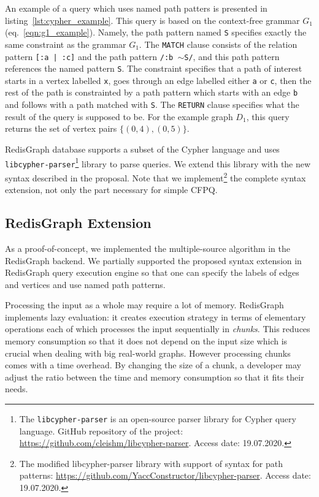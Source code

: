 An example of a query which uses named path patters is presented in listing~\ref{lst:cypher_example}.
This query is based on the context-free grammar $G_1$ (eq.~\ref{eqn:g1_example}).
Namely, the path pattern named \texttt{S} specifies exactly the same constraint as the grammar $G_1$.
The \texttt{MATCH} clause consists of the relation pattern \texttt{[:a | :c]} and the path pattern \texttt{/:b $\sim$S/}, and this path pattern references the named pattern \texttt{S}.
The constraint specifies that a path of interest starts in a vertex labelled \texttt{x}, goes through an edge labelled either \texttt{a} or \texttt{c}, then the rest of the path is constrainted by a path pattern which starts with an edge \texttt{b} and follows with a path matched with \texttt{S}.
The \texttt{RETURN} clause specifies what the result of the query is supposed to be.
For the example graph $D_1$, this query returns the set of vertex pairs $\{(0, 4), (0, 5)\}$.

RedisGraph database supports a subset of the Cypher language and uses \texttt{libcypher-parser}\footnote{The \texttt{libcypher-parser} is an open-source parser library for Cypher query language. GitHub repository of the project: \url{https://github.com/cleishm/libcypher-parser}. Access date: 19.07.2020.} library to parse queries.
We extend this library with the new syntax described in the proposal.
Note that we implement\footnote{The modified libcypher-parser library with support of syntax for path patterns: \url{https://github.com/YaccConstructor/libcypher-parser}. Access date: 19.07.2020.} the complete syntax extension, not only the part necessary for simple CFPQ.

\subsection{RedisGraph Extension}

As a proof-of-concept, we implemented the multiple-source algorithm in the RedisGraph backend.
We partially supported the proposed syntax extension in RedisGraph query execution engine so that one can specify the labels of edges and vertices and use named path patterns.

Processing the input as a whole may require a lot of memory.
RedisGraph implements lazy evaluation: it creates execution strategy in terms of elementary operations each of which processes the input sequentially in \emph{chunks}.
This reduces memory consumption so that it does not depend on the input size which is crucial when dealing with big real-world graphs.
However processing chunks comes with a time overhead.
By changing the size of a chunk, a developer may adjust the ratio between the time and memory consumption so that it fits their needs.

